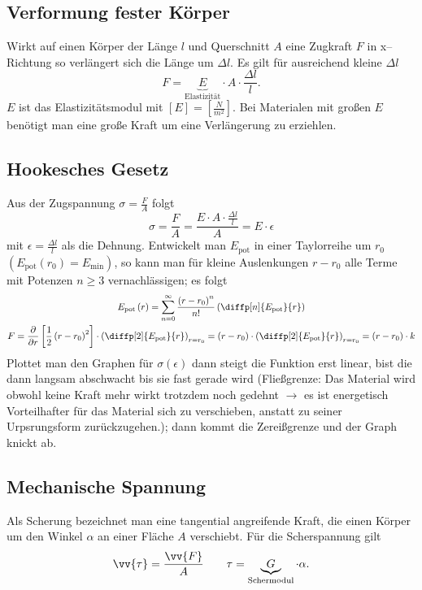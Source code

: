 \documentclass[a4paper,12pt]{article}
\numberwithin{equation}{section}
\begin{document}
\subsection{Verformung fester Körper}
Wirkt auf einen Körper der Länge $l$ und Querschnitt $A$ eine Zugkraft $F$ in x--Richtung so verlängert sich die Länge um $\Delta l$. Es gilt für ausreichend kleine $\Delta l$ 
\[ 
        F=\underbrace{E}_{\text{Elastizität}}\cdot A\cdot \dfrac{\Delta l}{l}
.\] 
$E$ ist das Elastizitätsmodul mit $[E]=[\tfrac{N}{m^2}]$. Bei Materialen mit großen $E$ benötigt man eine große Kraft um eine Verlängerung zu erziehlen. 
\subsection{Hookesches Gesetz}
Aus der Zugspannung $\sigma =\tfrac{F}{A}$ folgt 
\[ 
        \sigma =\dfrac{F}{A}=\dfrac{E\cdot A\cdot \tfrac{\Delta l}{l}}{A}=E\cdot \epsilon
\] 
mit $\epsilon=\tfrac{\Delta l}{l}$ als die Dehnung. Entwickelt man $E_{\text{pot}}$ in einer Taylorreihe um $r_0$ $\left(E_{\text{pot}}\left(r_0\right)=E_{\text{min}}\right)$, so kann man für kleine Auslenkungen $r-r_0$ alle Terme mit Potenzen $n\geq 3$ vernachlässigen; es folgt
\begin{gather*}
        E_{\text{pot}}\left(r\right)=\sum_{n=0}^{\infty}\dfrac{\left(r-r_0\right)^n}{n!}\left(\diffp[n]{E_{\text{pot} }}{r}\right)\\
        F=\dfrac{\partial}{\partial r}\left[\dfrac{1}{2}\left(r-r_0\right)^2\right]\cdot \left(\diffp[2]{E_{\text{pot} }}{r}\right)_{r=r_0}=\left(r-r_0\right)\cdot \left(\diffp[2]{E_{\text{pot}} }{r}\right)_{r=r_0}=\left(r-r_0\right)\cdot k
\end{gather*}
Plottet man den Graphen für $\sigma \left(\epsilon\right)$ dann steigt die Funktion erst linear, bist die dann langsam abschwacht bis sie fast gerade wird (Fließgrenze: Das Material wird obwohl keine Kraft mehr wirkt trotzdem noch gedehnt $\rightarrow $ es ist energetisch Vorteilhafter für das Material sich zu verschieben, anstatt zu seiner Urpsrungsform zurückzugehen.); dann kommt die Zereißgrenze und der Graph knickt ab.

\subsection{Mechanische Spannung}
Als Scherung bezeichnet man eine tangential angreifende Kraft, die einen Körper um den Winkel $\alpha $ an einer Fläche $A$ verschiebt. Für die Scherspannung gilt
\[ 
        \vv{\tau }=\dfrac{\vv{F}}{A}\qquad \tau =\underbrace{G}_{\text{Schermodul}}\cdot \alpha 
.\] 
\end{document}
